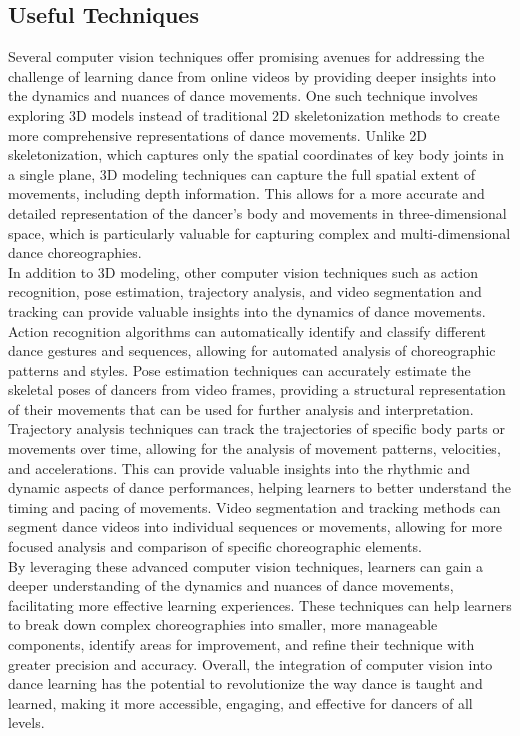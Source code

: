 \subsection{Useful Techniques}
\indent Several computer vision techniques offer promising avenues for addressing the challenge of learning 
dance from online videos by providing deeper insights into the dynamics and nuances of dance 
movements. One such technique involves exploring 3D models instead of traditional 2D skeletonization
 methods to create more comprehensive representations of dance movements. Unlike 2D skeletonization, 
 which captures only the spatial coordinates of key body joints in a single plane, 3D modeling 
 techniques can capture the full spatial extent of movements, including depth information\cite{Alpher03}. This 
 allows for a more accurate and detailed representation of the dancer's body and movements in 
 three-dimensional space, which is particularly valuable for capturing complex and multi-dimensional 
 dance choreographies\cite{Authors14b}.
\\
\indent In addition to 3D modeling, other computer vision techniques such as action recognition, pose 
estimation, trajectory analysis, and video segmentation and tracking can provide valuable insights 
into the dynamics of dance movements. Action recognition algorithms can automatically identify and 
classify different dance gestures and sequences, allowing for automated analysis of choreographic 
patterns and styles. Pose estimation techniques can accurately estimate the skeletal poses of 
dancers from video frames, providing a structural representation of their movements that can be 
used for further analysis and interpretation.
\\
\indent Trajectory analysis techniques can track the trajectories of specific body parts or movements 
over time, allowing for the analysis of movement patterns, velocities, and accelerations\cite{Alpher02}. This 
can provide valuable insights into the rhythmic and dynamic aspects of dance performances, 
helping learners to better understand the timing and pacing of movements. Video segmentation and 
tracking methods can segment dance videos into individual sequences or movements, allowing for more 
focused analysis and comparison of specific choreographic elements.
\\
\indent By leveraging these advanced computer vision techniques, learners can gain a deeper understanding 
of the dynamics and nuances of dance movements, facilitating more effective learning experiences. 
These techniques can help learners to break down complex choreographies into smaller, more 
manageable components, identify areas for improvement, and refine their technique with greater 
precision and accuracy. Overall, the integration of computer vision into dance learning has the 
potential to revolutionize the way dance is taught and learned, making it more accessible, engaging, 
and effective for dancers of all levels.

